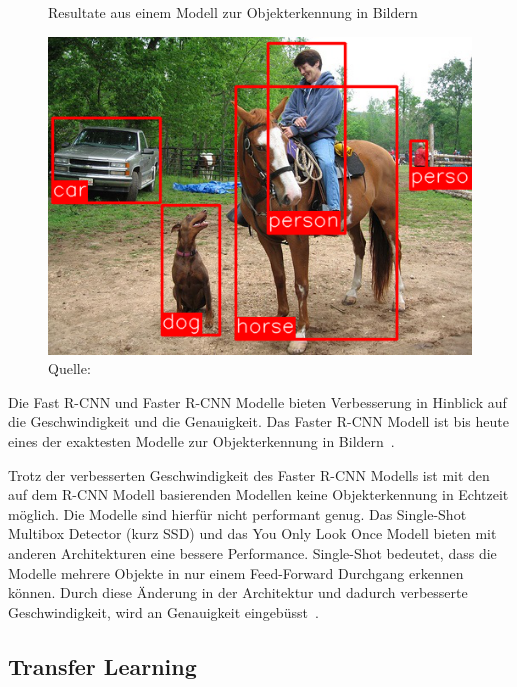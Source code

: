 \begin{figure}[h]
    \captionsetup{width=.9\linewidth}
    \caption{Resultate aus einem Modell zur Objekterkennung in Bildern}
    \label{fig:rcnn}
    \centering
    \includegraphics[scale=0.5]{graphics/rcnn.png}
    \caption*{Quelle: \textcite{SSD}}
\end{figure}

Die Fast R-CNN und Faster R-CNN Modelle bieten Verbesserung in Hinblick auf die Geschwindigkeit und die Genauigkeit. Das Faster R-CNN Modell ist bis heute eines der exaktesten Modelle zur Objekterkennung in Bildern~\autocite{SSD}.

Trotz der verbesserten Geschwindigkeit des Faster R-CNN Modells ist mit den auf dem R-CNN Modell basierenden Modellen keine Objekterkennung in Echtzeit möglich. Die Modelle sind hierfür nicht performant genug. Das Single-Shot Multibox Detector (kurz SSD) und das You Only Look Once Modell bieten mit anderen Architekturen eine bessere Performance. Single-Shot bedeutet, dass die Modelle mehrere Objekte in nur einem Feed-Forward Durchgang erkennen können. Durch diese Änderung in der Architektur und dadurch verbesserte Geschwindigkeit, wird an Genauigkeit eingebüsst~\autocite{SSD}.

\subsection{Transfer Learning}
\label{chap:transfer-learning}

